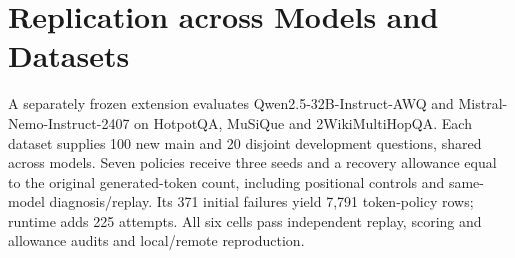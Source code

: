 \documentclass{article}
\begin{document}
\section{Replication across Models and Datasets}
\label{sec:replication}
A separately frozen extension evaluates Qwen2.5-32B-Instruct-AWQ and
Mistral-Nemo-Instruct-2407 on HotpotQA, MuSiQue and 2WikiMultiHopQA.
Each dataset supplies 100 new main and 20 disjoint development questions,
shared across models. Seven policies receive three seeds and a recovery
allowance equal to the original generated-token count, including positional
controls and same-model diagnosis/replay. Its 371 initial failures yield
7,791 token-policy rows; runtime adds 225 attempts. All six cells pass
independent replay, scoring and allowance audits and local/remote reproduction.

\begin{table}[t]
\centering\footnotesize
\caption{Completed replication. Rates are conditional repair success (\%).
$N_f$ counts failed questions; each policy receives three seeds per question.
$\Delta$ is uncertainty minus restart in percentage points, with an individual
95\% question-bootstrap interval. $p_H$ belongs to the fixed 24-comparison
Holm family. Failure cohorts differ between models.}
\label{tab:extension_overview}

\end{table}
\end{document}
